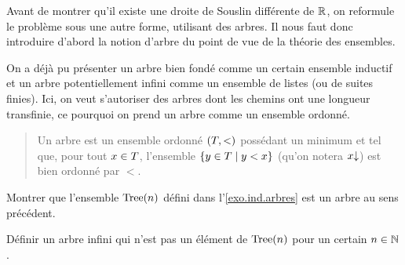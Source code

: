 \begin{problem}

  Avant de montrer qu'il existe une droite de Souslin différente de $\mathbb R$, on
  reformule le problème sous une autre forme, utilisant des arbres. Il nous faut
  donc introduire d'abord la notion d'arbre du point de vue de la théorie des
  ensembles.

  On a déjà pu présenter un arbre bien fondé comme un certain ensemble inductif
  et un arbre potentiellement infini comme un ensemble de listes (ou de suites
  finies). Ici, on veut s'autoriser des arbres dont les chemins ont une
  longueur transfinie, ce pourquoi on prend un arbre comme un ensemble ordonné.

  \begin{quotation}
    \noindent
    Un arbre est un ensemble ordonné $(T,<)$ possédant un minimum et tel
    que, pour tout $x \in T$, l'ensemble $\left\{ y \in T \;\middle\vert\; y < x \right\}$
    (qu'on notera $x\mathbin{\downarrow}$) est bien ordonné par $<$.
  \end{quotation}

  \begin{pbQuest}
  \item Montrer que l'ensemble $\operatorname{Tree}(n)$ défini dans l'\cref{exo.ind.arbres}
    est un arbre au sens précédent.
  \item Définir un arbre infini qui n'est pas un élément de $\operatorname{Tree}(n)$ pour un
    certain $n \in \mathbb N$.
  \end{pbQuest}


\end{problem}
